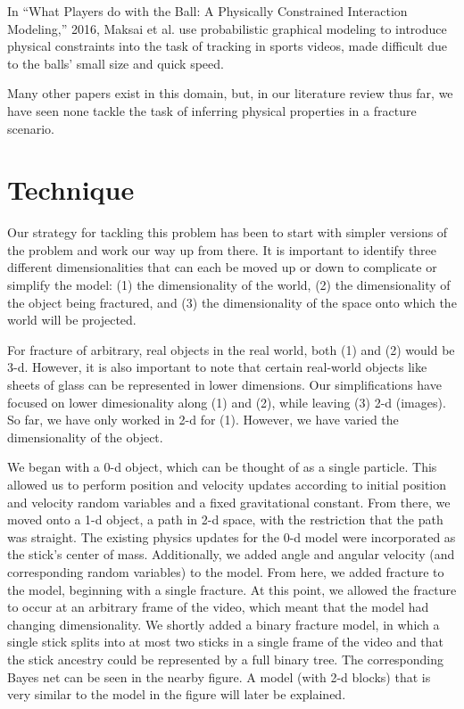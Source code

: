 \documentclass[runningheads]{llncs}
\begin{document}
In “What Players do with the Ball: A Physically Constrained Interaction Modeling,” 
2016, Maksai et al. use probabilistic graphical modeling to introduce physical 
constraints into the task of tracking in sports videos, made difficult due to 
the balls’ small size and quick speed.

Many other papers exist in this domain, but, in our literature review thus far, 
we have seen none tackle the task of inferring physical properties in a fracture 
scenario.

\section{Technique}

Our strategy for tackling this problem has been to start with simpler versions 
of the problem and work our way up from there. It is important to identify three 
different dimensionalities that can each be moved up or down to complicate or 
simplify the model: (1) the dimensionality of the world, (2) the 
dimensionality of the object being fractured, and (3) the dimensionality of the 
space onto which the world will be projected.

For fracture of arbitrary, real objects in the real world, both (1) and (2) 
would be 3-d. However, it is also important to note that certain real-world 
objects like sheets of glass can be represented in lower dimensions. Our 
simplifications have focused on lower dimesionality along (1) and (2), while 
leaving (3) 2-d (images). So far, we have only worked in 2-d for (1). However, 
we have varied the dimensionality of the object.

We began with a 0-d object, which can be thought of as a single particle. This 
allowed us to perform position and velocity updates according to initial 
position and velocity random variables and a fixed gravitational constant. 
From there, we moved onto a 1-d 
object, a path in 2-d space, with the restriction that the path was straight. 
The existing physics updates for the 0-d model were 
incorporated as the stick's center of mass. Additionally, we added angle 
and angular velocity (and corresponding random variables) to the model. From 
here, we added fracture to the model, 
beginning with a single fracture. At this point, we allowed the fracture to occur at 
an arbitrary frame of the video, which meant that the model had changing 
dimensionality. We shortly added a binary fracture model, in which a single 
stick splits into at most two sticks in a single frame of the video and that the 
stick ancestry could be represented by a full binary tree. The 
corresponding Bayes net can be seen in the nearby figure. A model (with 2-d blocks) 
that is very similar to the model in the figure will later be explained.
\end{document}
